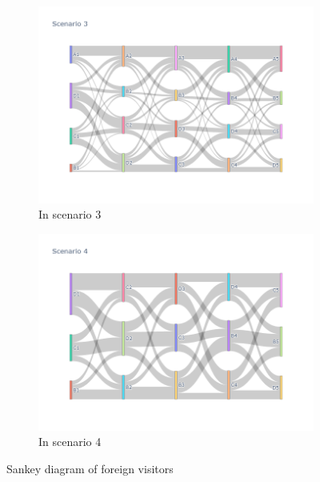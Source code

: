 \begin{figure}[h]
\begin{subfigure}{0.5\textwidth}
    \includegraphics[width=\linewidth]{Figure/Figure26c.jpg}
    \caption{In scenario 3}
    \label{fig26c}
  \end{subfigure}
  \begin{subfigure}{0.5\textwidth}
    \centering
    \includegraphics[width=\linewidth]{Figure/Figure26d.jpg}
    \caption{In scenario 4}
    \label{fig26d}
  \end{subfigure}
  \caption{Sankey diagram of foreign visitors }
  \label{fig26}
\end{figure}

